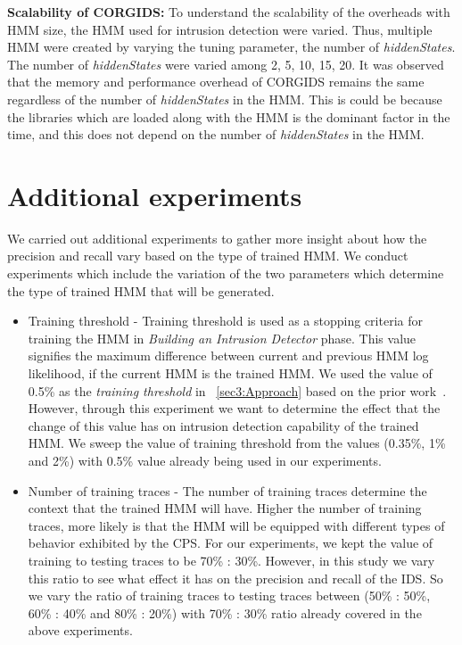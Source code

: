 \bigskip
\textbf{Scalability of CORGIDS:} To understand the scalability of the overheads with \ac{HMM} size, the \ac{HMM} used for intrusion detection were varied. Thus, multiple \ac{HMM} were created by varying the tuning parameter, the number of \textit{hiddenStates}. The number of \textit{hiddenStates} were varied among {2, 5, 10, 15, 20}. It was observed that the memory and performance overhead of \ac{CORGIDS} remains the same regardless of the number of \textit{hiddenStates} in the \ac{HMM}. This is could be because the libraries which are loaded along with the \ac{HMM} is the dominant factor in the time, and this does not depend on the number of \textit{hiddenStates} in the \ac{HMM}.

\section{Additional experiments}
We carried out additional experiments to gather more insight about how the precision and recall vary based on the type of trained \ac{HMM}.
We conduct experiments which include the variation of the two parameters which determine the type of trained \ac{HMM} that will be generated.
\begin{itemize}
\item Training threshold - Training threshold is used as a stopping criteria for training the \ac{HMM} in \textit{Building an Intrusion Detector} phase. This value signifies the maximum difference between current and previous \ac{HMM} log likelihood, if the current \ac{HMM} is the trained \ac{HMM}. We used the value of 0.5\% as the \textit{training threshold} in ~\autoref{sec3:Approach} based on the prior work~\cite{ferrer2000influence}. However, through this experiment we want to determine the effect that the change of this value has on intrusion detection capability of the trained \ac{HMM}. We sweep the value of training threshold from the values (0.35\%, 1\% and 2\%) with 0.5\% value already being used in our experiments.

\item Number of training traces - The number of training traces determine the context that the trained \ac{HMM} will have. Higher the number of training traces, more likely is that the \ac{HMM} will be equipped with different types of behavior exhibited by the \ac{CPS}. For our experiments, we kept the value of training to testing traces to be 70\% : 30\%. However, in this study we vary this ratio to see what effect it has on the precision and recall of the \ac{IDS}. So we vary the ratio of training traces to testing traces between (50\% : 50\%, 60\% : 40\% and 80\% : 20\%) with 70\% : 30\% ratio already covered in the above experiments.
\end{itemize}

